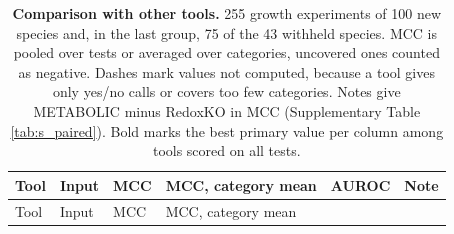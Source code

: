 \documentclass[10pt,a4paper,onecolumn]{article}
\begin{document}
\begin{longtable}[]{@{}
  >{\raggedright\arraybackslash}p{}
  >{\raggedright\arraybackslash}p{}
  >{\raggedleft\arraybackslash}p{}
  >{\raggedleft\arraybackslash}p{}
  >{\raggedleft\arraybackslash}p{}
  >{\raggedright\arraybackslash}p{}@{}}
\caption{\textbf{Comparison with other tools.} 255 growth experiments of
100 new species and, in the last group, 75 of the 43 withheld species.
MCC is pooled over tests or averaged over categories, uncovered ones
counted as negative. Dashes mark values not computed, because a tool
gives only yes/no calls or covers too few categories. Notes give
METABOLIC minus RedoxKO in MCC (Supplementary Table \ref{tab:s_paired}).
Bold marks the best primary value per column among tools scored on all
tests. \label{tab:tools}}\tabularnewline
\toprule\noalign{}
\begin{minipage}[b]{\linewidth}\raggedright
Tool
\end{minipage} & \begin{minipage}[b]{\linewidth}\raggedright
Input
\end{minipage} & \begin{minipage}[b]{\linewidth}\raggedleft
MCC
\end{minipage} & \begin{minipage}[b]{\linewidth}\raggedleft
MCC, category mean
\end{minipage} & \begin{minipage}[b]{\linewidth}\raggedleft
AUROC
\end{minipage} & \begin{minipage}[b]{\linewidth}\raggedright
Note
\end{minipage} \\
\midrule\noalign{}
\endfirsthead
\toprule\noalign{}
\begin{minipage}[b]{\linewidth}\raggedright
Tool
\end{minipage} & \begin{minipage}[b]{\linewidth}\raggedright
Input
\end{minipage} & \begin{minipage}[b]{\linewidth}\raggedleft
MCC
\end{minipage} & \begin{minipage}[b]{\linewidth}\raggedleft
MCC, category mean

\end{minipage}
\end{longtable}
\end{document}
